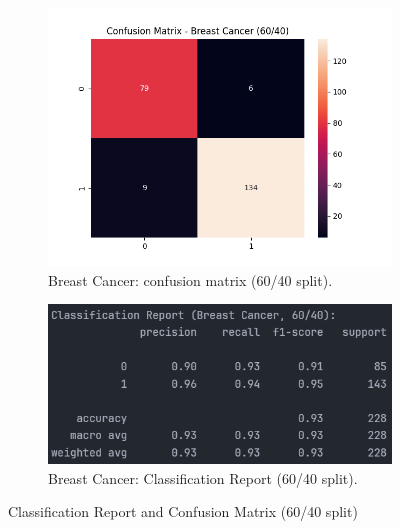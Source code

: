 \begin{figure}[H]
	\centering
	\begin{subfigure}{0.45\textwidth}
		\centering
		\includegraphics[width=\textwidth]{imgs/confusion_mat/confusion_mat__breast_cancer__60_vs_40.png}
		\caption{Breast Cancer: confusion matrix (60/40 split).}\label{fig:bc-cm-60-40}
	\end{subfigure}
	\hfill
	\begin{subfigure}{0.45\textwidth}
		\centering
		\includegraphics[width=\textwidth]{imgs/confusion_mat/class_rp__breast_cancer__60_vs_40.png}
		\caption{Breast Cancer: Classification Report (60/40 split).}\label{fig:bc-cr-60-40}
	\end{subfigure}

	\caption{Classification Report and Confusion Matrix (60/40 split)}\label{fig:bc-eval-60-40}
\end{figure}
